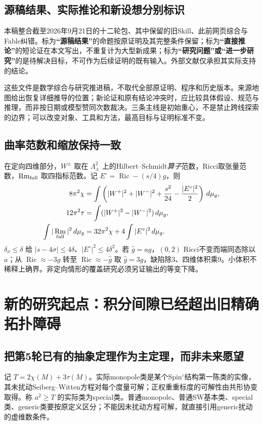 \documentclass[UTF8,fontset=fandol,zihao=-4]{ctexart}
\theoremstyle{research}
\DeclareMathOperator{\Ric}{Ric}\DeclareMathOperator{\Rm}{Rm}
\begin{document}
\subsection{源稿结果、实际推论和新设想分别标识}
本稿整合截至2026年9月21日的十二轮包\cite{Package}、其中保留的旧Skill\cite{Baseline}、此前网页综合与Fable纠错。标为\textbf{“源稿结果”}的命题按原证明及其完整条件保留；标为\textbf{“直接推论”}的短论证在本文写出，不重复计为大型新成果；标为\textbf{“研究问题”或“进一步研究”}的是待解决目标，不可作为后续证明的既有输入。外部文献仅承担其实际支持的结论。

这些文件是数学综合与研究推进稿，不取代全部原证明、程序和历史版本。来源地图给出恢复详细推导的位置；新论证和原有结论冲突时，应比较具体假设、规范与推理，而非按日期或模型赞同次数裁决。三条主线是初始重心，不是禁止跨线探索的边界；可以改变对象、工具和方法，最高目标与证明标准不变。

\subsection{曲率范数和缩放保持一致}
在定向四维部分，$W^\pm$ 取在 $\Lambda^2_\pm$ 上的Hilbert--Schmidt\emph{算子}范数，Ricci取张量范数，$\Rm_{\rm full}$ 取四指标范数。记 $E^\circ=\Ric-(s/4)g$，则
\begin{align}
 8\pi^2\chi&=\int\left(|W^+|^2+|W^-|^2+\frac{s^2}{24}-\frac{|E^\circ|^2}{2}\right)\dd,\label{eq:cgb}\\
 12\pi^2\tau&=\int(|W^+|^2-|W^-|^2)\dd,\\
 \int|\Rm_{\rm full}|^2\dd&=32\pi^2\chi+4\int|E^\circ|^2\dd.\label{eq:rm}
\end{align}
$\delta_\sigma\le\delta$ 给 $|s-4\sigma|\le4\delta$、$|E^\circ|^2\le4\delta^2$。若 $\widehat g=ag$，$(0,2)$ Ricci不变而端同态除以 $a$；从 $\Ric\approx-3g$ 转至 $\Ric\approx-\widehat g$ 取 $\widehat g=3g$，缺陷除3、四维体积乘9。小体积不稀释上确界。非定向情形的覆盖研究必须另证输出的等变下降。
\section[研究起点：新的积分统一间隙]{新的研究起点：积分间隙已经超出旧精确拓扑障碍}
\subsection{把第5轮已有的抽象定理作为主定理，而非未来愿望}
记 $T=2\chi(M)+3\tau(M)$。实际monopole类是某个Spin$^c$结构第一陈类的实像，其未扰动Seiberg--Witten方程对每个度量可解；正权重重标度的可解性由共形协变取得\cite{Lebrun06}。称 $a^2\ge T$ 的实际类为special类。普通monopole、普通SW基本类、special类、generic类要按原定义区分；不能因未扰动方程可解，就直接引用generic扰动的虚维数条件\cite{Kotschick}。
\end{document}
